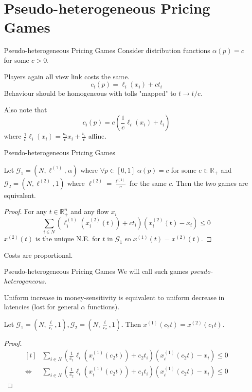 \documentclass{beamer}
\newcommand{\R}{\mathbb{R}}
\newcommand{\Gm}{\mathcal{G}}
\begin{document}
\section{Pseudo-heterogeneous Pricing Games}

\begin{frame}{Pseudo-heterogeneous Pricing Games}
	Consider distribution functions $\alpha(p) = c$ for some $c > 0$.

	Players again all view link costs the same.
	\[c_i(p) = \ell_i(x_i) + c t_i\]
	Behaviour should be homogeneous with tolls "mapped" to $t \rightarrow t/c$.

	Also note that 
	\[c_i(p) = c \left(\frac1c \ell_i(x_i) + t_i\right)\]
	where $\frac1c \ell_i(x_i) = \frac{a_i}{c} x_i + \frac{b_i}{c}$ affine.
\end{frame}

\begin{frame}{Pseudo-heterogeneous Pricing Games}
	\begin{lemma}
		Let $\Gm_1 = (N, \ell^{(1)}, \alpha)$ where $\forall p \in [0, 1] \; \alpha(p) = c$ for some $c \in \R_+$ and $\Gm_2 = (N, \ell^{(2)}, 1)$ where $\ell^{(2)} = \frac{\ell^{(1)}}{c}$ for the same $c$.
		Then the two games are equivalent.
	\end{lemma}
	\begin{proof}
		For any $t \in \R_+^n$ and any flow $x_i$
		\[
			\sum_{i \in N} \left(\ell_i^{(1)}(x_i^{(2)}(t)) + c t_i\right) \left(x_i^{(2)}(t) - x_i\right) \leq 0
		\]
		$x^{(2)}(t)$ is the unique N.E. for $t$ in $\Gm_1$ so $x^{(1)}(t) = x^{(2)}(t)$.
	\end{proof}
	Costs are proportional.
\end{frame}

\begin{frame}{Pseudo-heterogeneous Pricing Games}
	We will call such games \textit{pseudo-heterogeneous}.

	Uniform increase in money-sensitivity is equivalent to uniform decrease in latencies (lost for general $\alpha$ functions).

	\begin{lemma}
		Let $\Gm_1 = \left(N, \frac{\ell}{c_1}, 1\right), \Gm_2 = \left(N, \frac{\ell}{c_2}, 1\right)$.
		Then $x^{(1)}(c_2 t) = x^{(2)}(c_1 t)$.
	\end{lemma}
	\begin{proof}
		\[
			\begin{aligned}[t]
				&\sum_{i \in N} \left(\frac{1}{c_1}\ell_i(x_i^{(1)}(c_2 t)) + c_2 t_i\right) \left(x_i^{(1)}(c_2 t) - x_i\right) \le 0\\
				\Leftrightarrow &\sum_{i \in N} \left(\frac{1}{c_2}\ell_i(x_i^{(1)}(c_2 t)) + c_1 t_i\right) \left(x_i^{(1)}(c_2 t) - x_i\right) \le 0
			\end{aligned}
		\]
	\end{proof}
\end{frame}
\end{document}
